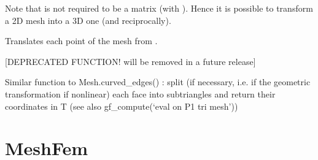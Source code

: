 \documentclass[a4paper,11pt,english]{sphinxmanual}
\begin{document}
\begin{fulllineitems}
\begin{fulllineitems}
Note that  is not required to be a  matrix (with
). Hence it is possible to transform
a 2D mesh into a 3D one (and reciprocally).

\end{fulllineitems}


\begin{fulllineitems}
\label{\detokenize{python/cmdref_Mesh:getfem.Mesh.translate}}
Translates each point of the mesh from .

\end{fulllineitems}


\begin{fulllineitems}
\label{\detokenize{python/cmdref_Mesh:getfem.Mesh.triangulated_surface}}
{[}DEPRECATED FUNCTION! will be removed in a future release{]}

Similar function to Mesh.curved\_edges() : split (if
necessary, i.e. if the geometric transformation if non\sphinxhyphen{}linear)
each face into sub\sphinxhyphen{}triangles and return their coordinates in T
(see also gf\_compute(‘eval on P1 tri mesh’))

\end{fulllineitems}


\end{fulllineitems}



\section{MeshFem}
\label{\detokenize{python/cmdref_MeshFem:meshfem}}\label{\detokenize{python/cmdref_MeshFem::doc}}
\end{document}
